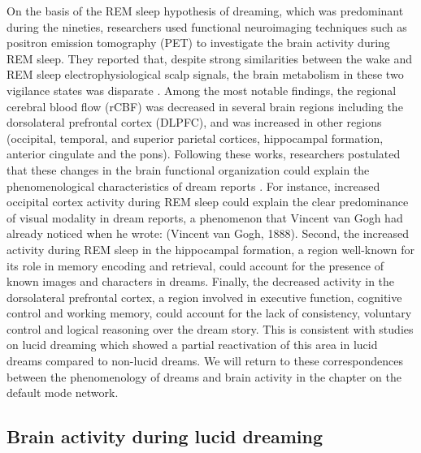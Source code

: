 On the basis of the REM sleep hypothesis of dreaming, which was predominant during the nineties, researchers used functional neuroimaging techniques such as positron emission tomography (PET) to investigate the brain activity during REM sleep. They reported that, despite strong similarities between the wake and REM sleep electrophysiological scalp signals, the brain metabolism in these two vigilance states was disparate \citep{maquet_functional_1996, braun_regional_1997}. Among the most notable findings, the regional cerebral blood flow (rCBF) was decreased in several brain regions including the dorsolateral prefrontal cortex (DLPFC), and was increased in other regions (occipital, temporal, and superior parietal cortices, hippocampal formation, anterior cingulate and the pons). Following these works, researchers postulated that these changes in the brain functional organization could explain the phenomenological characteristics of dream reports \citep{hobson_dreaming_2000, nir_dreaming_2010}. For instance, increased occipital cortex activity during REM sleep could explain the clear predominance of visual modality in dream reports, a phenomenon that Vincent van Gogh had already noticed when he wrote:  (Vincent van Gogh, 1888). Second, the increased activity during REM sleep in the hippocampal formation, a region well-known for its role in memory encoding and retrieval, could account for the presence of known images and characters in dreams. Finally, the decreased activity in the dorsolateral prefrontal cortex, a region involved in executive function, cognitive control and working memory, could account for the lack of consistency, voluntary control and logical reasoning over the dream story. This is consistent with studies on lucid dreaming which showed a partial reactivation of this area in lucid dreams compared to non-lucid dreams. We will return to these correspondences between the phenomenology of dreams and brain activity in the chapter on the default mode network.

\subsection{Brain activity during lucid dreaming}
\label{sec:dream-research:attempts:ba-lucid}

